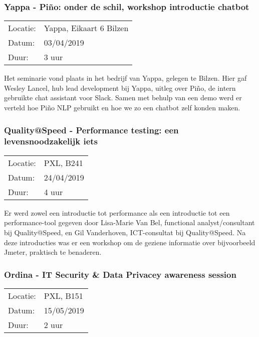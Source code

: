 \subsubsection{Yappa - Piño: onder de schil, workshop introductie chatbot}

\begin{tabular}{l l}
  Locatie: & Yappa, Eikaart 6 Bilzen\\
  Datum: & 03/04/2019\\
  Duur: & 3 uur
\end{tabular}

Het seminarie vond plaats in het bedrijf van Yappa, gelegen te Bilzen. Hier gaf Wesley Lancel, hub lead development bij Yappa, uitleg over Piño, de intern gebruikte chat assistant voor Slack. Samen met behulp van een demo werd er verteld hoe Piño NLP gebruikt en hoe we zo een chatbot zelf konden maken.

\subsubsection{Quality@Speed - Performance testing: een levensnoodzakelijk iets}

\begin{tabular}{l l}
  Locatie: & PXL, B241\\
  Datum: & 24/04/2019\\
  Duur: & 4 uur
\end{tabular}

Er werd zowel een introductie tot performance als een introductie tot een performance\hyp{}tool gegeven door Lisa\hyp{}Marie Van Bel, functional analyst/consultant bij Quality@Speed, en Gil Vanderhoven, ICT\hyp{}consultat bij Quality@Speed. Na deze introducties was er een workshop om de geziene informatie over bijvoorbeeld Jmeter, praktisch te benaderen.

\subsubsection{Ordina - IT Security \& Data Privacey awareness session}

\begin{tabular}{l l}
  Locatie: & PXL, B151\\
  Datum: & 15/05/2019\\
  Duur: & 2 uur
\end{tabular}

